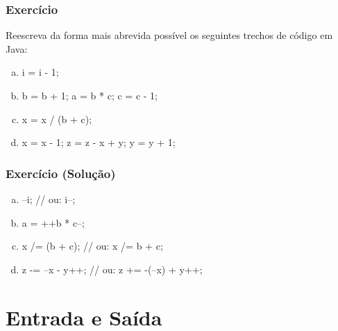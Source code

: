 \documentclass[xcolor={dvipsnames,table},aspectratio=169]{beamer}
\begin{document}
\begin{frame}[fragile]\frametitle{Exercício}
Reescreva da forma mais abrevida possível os seguintes trechos de código em Java:
\begin{enumerate}[a)]
	\item 
\begin{javacode}
i = i - 1;
\end{javacode}
	\item
\begin{javacode}
b = b + 1;
a = b * c;
c = c - 1;
\end{javacode}
	\item
\begin{javacode}
x = x / (b + c);
\end{javacode}
	\item
\begin{javacode}
x = x - 1;
z = z - x + y;
y = y + 1;
\end{javacode}
\end{enumerate}
\end{frame}

\begin{frame}[fragile]\frametitle{Exercício (Solução)}
\begin{enumerate}[a)]
	\item 
\begin{javacode}
--i;     // ou:    i--;
\end{javacode}
	\item
\begin{javacode}
a = ++b * c--;
\end{javacode}
	\item
\begin{javacode}
x /= (b + c);     // ou:    x /= b + c;
\end{javacode}
	\item
\begin{javacode}
z -= --x - y++;     // ou:    z += -(--x) + y++;
\end{javacode}
\end{enumerate}
\end{frame}

\section{Entrada e Saída}
\end{document}
